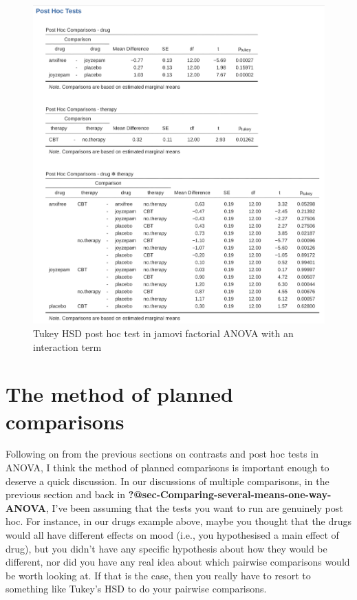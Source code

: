 \documentclass[
  a4paper,
]{book}
\begin{document}
\begin{figure}

\includegraphics[width=1\textwidth,height=\textheight]{images/fig14-25.png} \hfill{}

\caption{\label{fig-fig14-25}Tukey HSD post hoc test in jamovi factorial
ANOVA with an interaction term}

\end{figure}

\hypertarget{sec-The-method-of-planned-comparisons}{%
\section{The method of planned
comparisons}\label{sec-The-method-of-planned-comparisons}}

Following on from the previous sections on contrasts and post hoc tests
in ANOVA, I think the method of planned comparisons is important enough
to deserve a quick discussion. In our discussions of multiple
comparisons, in the previous section and back in
\textbf{?@sec-Comparing-several-means-one-way-ANOVA}, I've been assuming
that the tests you want to run are genuinely post hoc. For instance, in
our drugs example above, maybe you thought that the drugs would all have
different effects on mood (i.e., you hypothesised a main effect of
drug), but you didn't have any specific hypothesis about how they would
be different, nor did you have any real idea about which pairwise
comparisons would be worth looking at. If that is the case, then you
really have to resort to something like Tukey's HSD to do your pairwise
comparisons.
\end{document}
